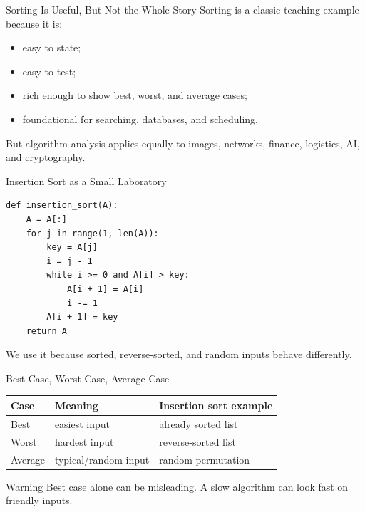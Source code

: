 \documentclass[aspectratio=169,xcolor=dvipsnames]{beamer}
\begin{document}
\begin{frame}{Sorting Is Useful, But Not the Whole Story}
  Sorting is a classic teaching example because it is:
  \begin{itemize}
    \item easy to state;
    \item easy to test;
    \item rich enough to show best, worst, and average cases;
    \item foundational for searching, databases, and scheduling.
  \end{itemize}
  \vspace{0.5em}
  But algorithm analysis applies equally to images, networks, finance, logistics, AI, and cryptography.
\end{frame}

\begin{frame}[fragile]{Insertion Sort as a Small Laboratory}
  \begin{lstlisting}
def insertion_sort(A):
    A = A[:]
    for j in range(1, len(A)):
        key = A[j]
        i = j - 1
        while i >= 0 and A[i] > key:
            A[i + 1] = A[i]
            i -= 1
        A[i + 1] = key
    return A
  \end{lstlisting}
  \vspace{0.3em}
  We use it because sorted, reverse-sorted, and random inputs behave differently.
\end{frame}

\begin{frame}{Best Case, Worst Case, Average Case}
  \begin{table}
    \centering
    \begin{tabular}{lll}
      \toprule
      Case & Meaning & Insertion sort example \\
      \midrule
      Best & easiest input & already sorted list \\
      Worst & hardest input & reverse-sorted list \\
      Average & typical/random input & random permutation \\
      \bottomrule
    \end{tabular}
  \end{table}
  \vspace{0.5em}
  \begin{alertblock}{Warning}
    Best case alone can be misleading. A slow algorithm can look fast on friendly inputs.
  \end{alertblock}
\end{frame}
\end{document}
